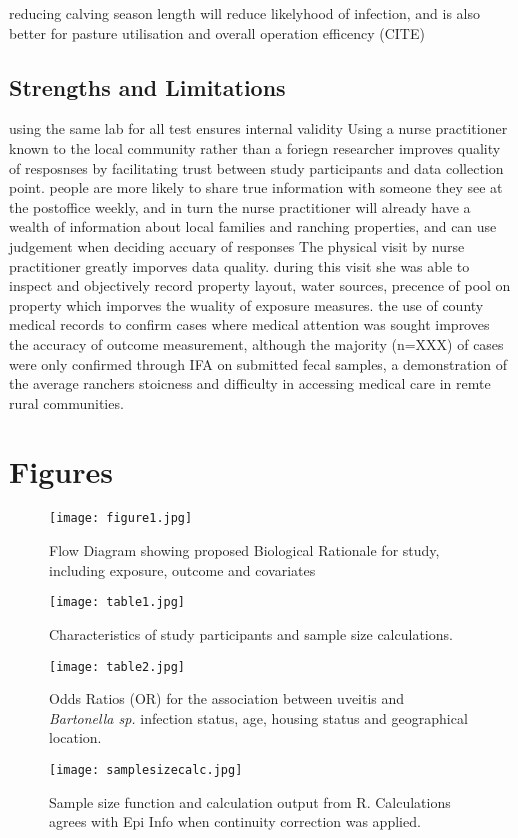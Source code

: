 \documentclass[12pt]{article}
\begin{document}
		reducing calving season length will reduce likelyhood of infection, and is also better for pasture utilisation and overall operation efficency (CITE)	

	\subsection{Strengths and Limitations}
		

		using the same lab for all test ensures internal validity
		Using a nurse practitioner known to the local community rather than a foriegn researcher improves quality of resposnses by facilitating trust between study participants and data collection point. people are more likely to share true information with someone they see at the postoffice weekly, and in turn the nurse practitioner will already have a wealth of information about local families and ranching properties, and can use judgement when deciding accuary of responses
		The physical visit by nurse practitioner greatly imporves data quality. during this visit she was able to inspect and objectively record property layout, water sources, precence of pool on property which imporves the wuality of exposure measures.
		the use of county medical records to confirm cases where medical attention was sought improves the accuracy of outcome measurement, although the majority (n=XXX) of cases were only confirmed through IFA on submitted fecal samples, a demonstration of the average ranchers stoicness and difficulty in accessing medical care in remte rural communities. 

		\flushpage
		
	\section{Figures}

\begin{figure*}[h!]
	\centering
	\texttt{[image: figure1.jpg]}
	\caption{Flow Diagram showing proposed Biological Rationale for study, including exposure, outcome and covariates }
	\label{fig:1}
\end{figure*}

\begin{figure*}[h!]
	\centering
	\texttt{[image: table1.jpg]}
	\caption{Characteristics of study participants and sample size calculations.}
	\label{tab:1}
\end{figure*}
 
\begin{figure*}[h!]
	\centering
	\texttt{[image: table2.jpg]}
	\caption{Odds Ratios (OR) for the association between uveitis and \emph{Bartonella sp.} infection status, age, housing status and geographical location.}
	\label{tab:2}
\end{figure*}

\begin{figure*}[h!]
	\centering
	\texttt{[image: samplesizecalc.jpg]}
	\caption{Sample size function and calculation output from R. Calculations agrees with Epi Info when continuity correction was applied.}
	\label{fig:samplesizecalc}
\end{figure*}

\clearpage


\end{document}
